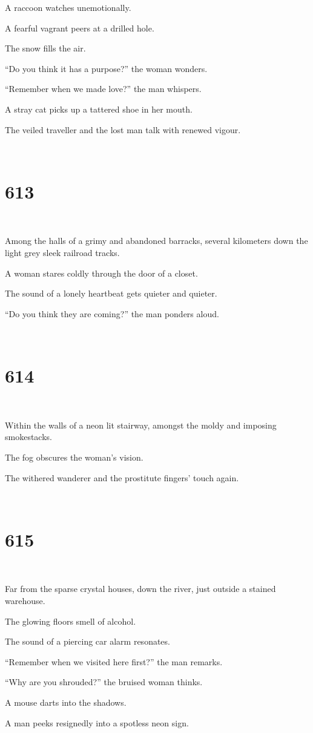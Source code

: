 \documentclass{report}
\begin{document}
A raccoon watches unemotionally.

A fearful vagrant peers at a drilled hole.

The snow fills the air.

``Do you think it has a purpose?'' the woman wonders.

``Remember when we made love?'' the man whispers.

A stray cat picks up a tattered shoe in her mouth.

The veiled traveller and the lost man talk with renewed vigour.

~
\chapter*{613}
~

Among the halls of a grimy and abandoned barracks, several kilometers down the light grey sleek railroad tracks.

A woman stares coldly through the door of a closet.

The sound of a lonely heartbeat gets quieter and quieter.

``Do you think they are coming?'' the man ponders aloud.

~
\chapter*{614}
~

Within the walls of a neon lit stairway, amongst the moldy and imposing smokestacks.

The fog obscures the woman's vision.

The withered wanderer and the prostitute fingers' touch again.

~
\chapter*{615}
~

Far from the sparse crystal houses, down the river, just outside a stained warehouse.

The glowing floors smell of alcohol.

The sound of a piercing car alarm resonates.

``Remember when we visited here first?'' the man remarks.

``Why are you shrouded?'' the bruised woman thinks.

A mouse darts into the shadows.

A man peeks resignedly into a spotless neon sign.
\end{document}
